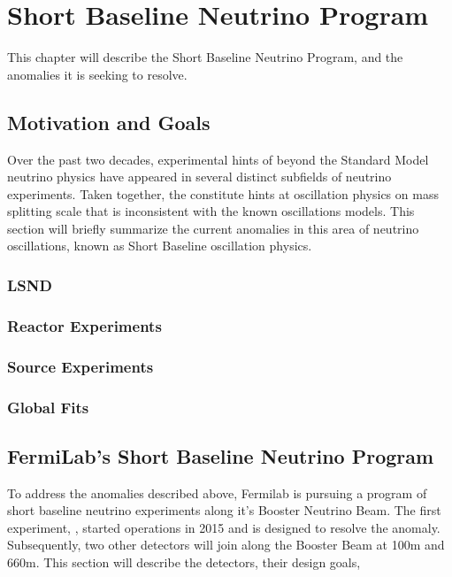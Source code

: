 \chapter{Short Baseline Neutrino Program}

This chapter will describe the Short Baseline Neutrino Program, and the anomalies it is seeking to resolve.

\section{Motivation and Goals}

Over the past two decades, experimental hints of beyond the Standard Model neutrino physics have appeared in several distinct subfields of neutrino experiments.  Taken together, the constitute hints at oscillation physics on mass splitting scale that is inconsistent with the known oscillations models.  This section will briefly summarize the current anomalies in this area of neutrino oscillations, known as Short Baseline oscillation physics.

\subsection{LSND}

\subsection{Reactor Experiments}

\subsection{Source Experiments}

\subsection{\MB}

\subsection{Global Fits}

\section{FermiLab's Short Baseline Neutrino Program}

To address the anomalies described above, Fermilab is pursuing a program of short baseline neutrino experiments along it's Booster Neutrino Beam.  The first experiment, \uboone, started operations in 2015 and is designed to resolve the \MB anomaly.  Subsequently, two other detectors will join \uboone along the Booster Beam at 100m and 660m.  This section will describe the detectors, their design goals, 

